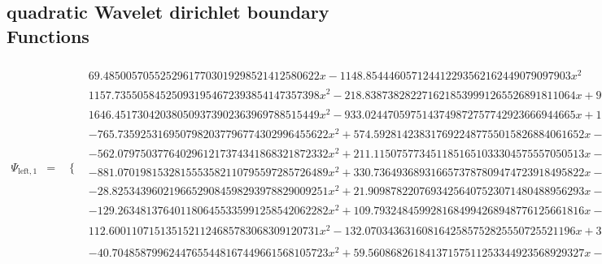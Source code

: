 \documentclass{article}
\begin{document}
 \begin{landscape}
 \subsection{quadratic Wavelet dirichlet boundary Functions}
 \begin{eqnarray*}
 \Psi_{\text{left},1} & = & \begin{array}{cc}
 \{ & 
\begin{array}{cc}
 69.48500570552529617703019298521412580622 x-1148.854446057124412293562162449079097903 x^2 & x\geq 0\land x<\frac{1}{16} \\
 1157.735505845250931954672393854147357398 x^2-218.8387382822716218539991265526891811064 x+9.010116999618653688469666235559478341020 & x\geq \frac{1}{16}\land x<\frac{1}{8} \\
 1646.451730420380509373902363969788515449 x^2-933.0244705975143749872757742923666944665 x+128.8936162273774692755005762978731024125 & x\geq \frac{1}{4}\land x<\frac{5}{16} \\
 -765.7359253169507982037796774302996455622 x^2+574.5928142383176922487755015826884061652 x-106.6715845282212912301324355576042570612 & x\geq \frac{5}{16}\land x<\frac{3}{8} \\
 -562.0797503776402961217374341868321872332 x^2+211.1150757734511851651033304575557050513 x-17.86199637886402175022423732758082704384 & x\geq \frac{1}{8}\land x<\frac{3}{16} \\
 -881.0701981532815553582110795597285726489 x^2+330.7364936893166573787809474723918495822 x-29.07650430847640977025651392272171559361 & x\geq \frac{3}{16}\land x<\frac{1}{4} \\
 -28.82534396021966529084598293978829009251 x^2+21.90987822076934256407523071480488956293 x-3.043534024930975664251134769876097698301 & x\geq \frac{3}{8}\land x<\frac{7}{16} \\
 -129.2634813764011806455335991258542062282 x^2+109.7932484599281684994268948776125661816 x-22.26802126474696883760931130549027695865 & x\geq \frac{7}{16}\land x<\frac{1}{2} \\
 112.6001107151351521124685783068309120731 x^2-132.0703436316081642585752825550725521196 x+38.19787675813711435189123305268100261667 & \left(x\geq \frac{1}{2}\land x<\frac{9}{16}\right)\lor \left(x\geq \frac{9}{16}\land x<\frac{5}{8}\right) \\
 -40.70485879962447655448167449661568105723 x^2+59.56086826184137157511253344923568929327 x-21.68687695856586559613620944866532282486 & \left(x\geq \frac{5}{8}\land x<\frac{11}{16}\right)\lor \left(x\geq \frac{11}{16}\land x<\frac{3}{4}\right) \\

\end{array}
\end{array}
\end{eqnarray*}
\end{landscape}
\end{document}
